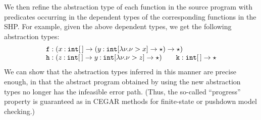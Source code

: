 We then refine the abstraction type of each function in the source 
program with predicates occurring in the dependent types of the 
corresponding functions in the SHP. For example, given the above 
dependent types, we get the following abstraction types:
\[
\begin{array}{l}
\texttt{f}: (x\mathbin{:}\mathtt{int}[\,]\rightarrow (y\mathbin{:}\mathtt{int}[\lambda \nu.\nu>x]\rightarrow \star)\rightarrow\star) \\
\texttt{h}: (z\mathbin{:}\mathtt{int}[\,]\rightarrow y\mathbin{:} \mathtt{int}[\lambda \nu.\nu>z]\rightarrow \star) \qquad
\texttt{k}: \mathtt{int}[\,]\rightarrow\star
\end{array}
\]
We can show that the abstraction types inferred in this manner are 
precise enough, in that the abstract program obtained by using the new 
abstraction types no longer has the infeasible error path. (Thus, the 
so-called ``progress'' property is guaranteed as in CEGAR methods for 
finite-state or pushdown model checking.)

